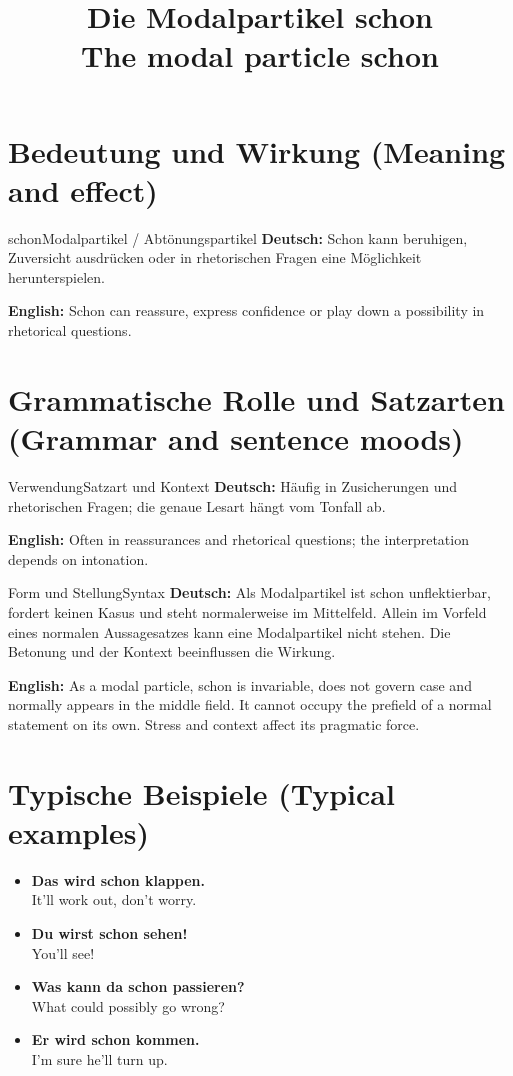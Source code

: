 \documentclass[a4paper,11pt]{article}
\title{Die Modalpartikel \glqq schon\grqq\\{\large\textnormal{The modal particle schon}}}
\date{}
\newcommand{\GermanText}[1]{\textbf{Deutsch: }#1\par}
\newcommand{\EnglishText}[1]{{\small\color{SoftGray}\textbf{English: }#1\par}}
\newcommand{\ExampleItem}[2]{\item \textbf{#1}\\{\small\color{SoftGray}#2}}
\begin{document}
\maketitle
\tableofcontents
\section{Bedeutung und Wirkung \textnormal{(Meaning and effect)}}
\begin{grammarentry}{schon}{Modalpartikel / Abtönungspartikel}
\GermanText{Schon kann beruhigen, Zuversicht ausdrücken oder in rhetorischen Fragen eine Möglichkeit herunterspielen.}
\EnglishText{Schon can reassure, express confidence or play down a possibility in rhetorical questions.}
\end{grammarentry}
\section{Grammatische Rolle und Satzarten \textnormal{(Grammar and sentence moods)}}
\begin{grammarentry}{Verwendung}{Satzart und Kontext}
\GermanText{Häufig in Zusicherungen und rhetorischen Fragen; die genaue Lesart hängt vom Tonfall ab.}
\EnglishText{Often in reassurances and rhetorical questions; the interpretation depends on intonation.}
\end{grammarentry}
\begin{grammarentry}{Form und Stellung}{Syntax}
\GermanText{Als Modalpartikel ist schon unflektierbar, fordert keinen Kasus und steht normalerweise im Mittelfeld. Allein im Vorfeld eines normalen Aussagesatzes kann eine Modalpartikel nicht stehen. Die Betonung und der Kontext beeinflussen die Wirkung.}
\EnglishText{As a modal particle, schon is invariable, does not govern case and normally appears in the middle field. It cannot occupy the prefield of a normal statement on its own. Stress and context affect its pragmatic force.}
\end{grammarentry}
\section{Typische Beispiele \textnormal{(Typical examples)}}
\begin{exbox}\begin{itemize}
\ExampleItem{Das wird schon klappen.}{It'll work out, don't worry.}
\ExampleItem{Du wirst schon sehen!}{You'll see!}
\ExampleItem{Was kann da schon passieren?}{What could possibly go wrong?}
\ExampleItem{Er wird schon kommen.}{I'm sure he'll turn up.}
\end{itemize}\end{exbox}
\end{document}

